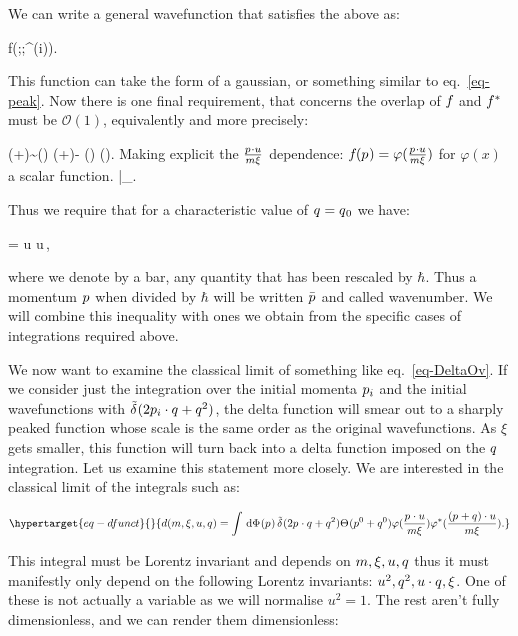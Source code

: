 \documentclass[
  10pt,
  a4paper,
  DIV=11,
  numbers=noendperiod,
  twoside]{scrreprt}
\let\[\relax \let\]\relax %
\DeclareRobustCommand{\[}{\begin{equation}}
\DeclareRobustCommand{\]}{\end{equation}}
\begin{document}
We can write a general wavefunction that satisfies the above as:

\[
f(\vert\cls{\vel[i]};\mass[i] ;\beta^{(i)}).
\]

This function can take the form of a gaussian, or something similar to
eq.~\ref{eq-peak}. Now there is one final requirement, that concerns the
overlap of \(\wf\) and \(\cwf\) must be \(\mathcal{O}(1)\), equivalently
and more precisely:

\[
\cwf(\emom+\tm)\sim \cwf(\emom) \implies \cwf(\emom+\tm)- \cwf(\emom) \implies \ct{\tm}\cwf(\emom).
\] Making explicit the \(\frac{\emom \cdot u }{m \xi}\) dependence:
\(\wf(\emom)=\varphi(\frac{\emom \cdot u }{m \xi})\) for \(\varphi(x)\)
a scalar function.
\[\implies {}\Bigr|_{}.\]

Thus we require that for a characteristic value of \(\tm=\co[0]{\tm}\)
we have:

\[
=\co[0]{\tw} \cdot u\iff \co[0]{\tw} \cdot u\,\wfwidth\ll \sqrt{ \xi},
\]

where we denote by a bar, any quantity that has been rescaled by
\(\hbar\). Thus a momentum \(\emom\) when divided by \(\hbar\) will be
written \(\bar{\emom}\) and called wavenumber. We will combine this
inequality with ones we obtain from the specific cases of integrations
required above.

We now want to examine the classical limit of something like
eq.~\ref{eq-DeltaOv}. If we consider just the integration over the
initial momenta \(\emom[i]\) and the initial wavefunctions with
\(\ndeltafn{2 \emom[i] \cdot \tm+\tm^2}\), the delta function will smear
out to a sharply peaked function whose scale is the same order as the
original wavefunctions. As \(\xi\) gets smaller, this function will turn
back into a delta function imposed on the \(\tm\) integration. Let us
examine this statement more closely. We are interested in the classical
limit of the integrals such as:

\begin{equation}\protect\hypertarget{eq-dfunct}{}{
d(m,\xi,u,\tm)=\int \ddP{\emom} \ndeltafn{2 \emom \cdot \tm+\tm^2} \thetafn{\emom^0+\tm^0}\varphi(\frac{\emom \cdot u }{m \xi})\varphi^*(\frac{(\emom+\tm) \cdot u }{m \xi}).
}\label{eq-dfunct}\end{equation}

This integral must be Lorentz invariant and depends on \(m,\xi, u,\tm\)
thus it must manifestly only depend on the following Lorentz invariants:
\(u^2,\tm^2,u \cdot \tm, \xi\). One of these is not actually a variable
as we will normalise \(u^2=1\). The rest aren't fully dimensionless, and
we can render them dimensionless:
\end{document}
